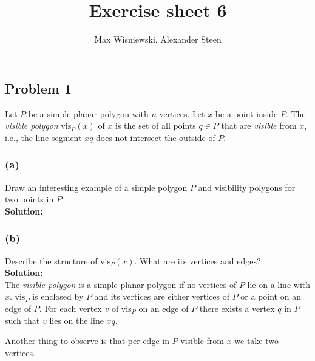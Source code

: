 \documentclass[11pt,a4paper,ngerman]{article}
\date{}
\title{Exercise sheet 6}
\author{Max Wisniewski, Alexander Steen}
\begin{document}

\renewcommand{\figurename}{Figure}

\maketitle
\thispagestyle{fancy}

\subsection*{Problem 1}

Let $P$ be a simple planar polygon with $n$ vertices. Let $x$ be a point inside $P$. The \emph{visible polygon} $\text{vis}_P(x)$ of $x$ is the set of all points $q \in P$ that are \emph{visible} from $x$, i.e., the line segment $xq$ does not intersect the outside of $P$.

\subsubsection*{(a)}
Draw an interesting example of a simple polygon $P$ and visibility polygons
for two points in $P$.\\

\textbf{Solution:}\\

\vspace{15cm}

\subsubsection*{(b)}
Describe the structure of $\text{vis}_P(x)$. What are its vertices and edges?\\

\textbf{Solution:}\\

The \emph{visible polygon} is a simple planar polygon if no vertices of $P$ lie on a line with $x$. $\text{vis}_P$ is enclosed by $P$ and its vertices are
either vertices of $P$ or a point on an edge of $P$. For each vertex $v$ of $\text{vis}_P$ on an edge of $P$ there exists a vertex $q$ in $P$ such that $v$ lies
on the line $xq$.

Another thing to observe is that per edge in $P$ visible from $x$ we take two vertices.
\end{document}
